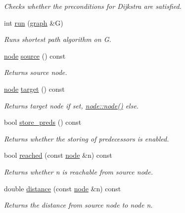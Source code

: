 \begin{DoxyCompactItemize}
\begin{DoxyCompactList}\small\item\em Checks whether the preconditions for Dijkstra are satisfied. \end{DoxyCompactList}\item 
int \mbox{\hyperlink{classdijkstra_a7b30f3d8ad42baae27989bc14befe0d0}{run}} (\mbox{\hyperlink{classgraph}{graph}} \&G)
\begin{DoxyCompactList}\small\item\em Runs shortest path algorithm on {\ttfamily G}. \end{DoxyCompactList}\item 
\mbox{\hyperlink{classnode}{node}} \mbox{\hyperlink{classdijkstra_a69772d19321b5e4deac66174ec546caa}{source}} () const
\begin{DoxyCompactList}\small\item\em Returns source node. \end{DoxyCompactList}\item 
\mbox{\hyperlink{classnode}{node}} \mbox{\hyperlink{classdijkstra_a4957ef4369386ef2153359ea97da9d88}{target}} () const
\begin{DoxyCompactList}\small\item\em Returns target node if set, {\ttfamily \mbox{\hyperlink{classnode_ad603259398d5667e3b97a6322a2bcc20}{node\+::node()}}} else. \end{DoxyCompactList}\item 
bool \mbox{\hyperlink{classdijkstra_a8ef3ee087994a56b774f48fd331725a3}{store\+\_\+preds}} () const
\begin{DoxyCompactList}\small\item\em Returns whether the storing of predecessors is enabled. \end{DoxyCompactList}\item 
bool \mbox{\hyperlink{classdijkstra_a405ff80abfc9ad98668534032eed6a5b}{reached}} (const \mbox{\hyperlink{classnode}{node}} \&n) const
\begin{DoxyCompactList}\small\item\em Returns whether {\ttfamily n} is reachable from source node. \end{DoxyCompactList}\item 
double \mbox{\hyperlink{classdijkstra_ae350a266dd47091d7f620a7328619426}{distance}} (const \mbox{\hyperlink{classnode}{node}} \&n) const
\begin{DoxyCompactList}\small\item\em Returns the distance from source node to node {\ttfamily n}. \end{DoxyCompactList}\item 

\end{DoxyCompactItemize}
